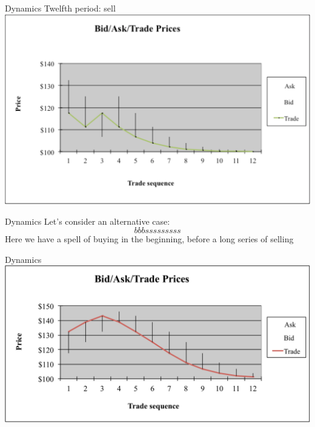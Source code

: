 \documentclass[english,10pt]{beamer}
\begin{document}
\begin{frame}{Dynamics}
	Twelfth period: sell
	\center
	\includegraphics[width=0.9\linewidth]{pics/P12_Image.pdf}
\end{frame}


\begin{frame}{Dynamics}
	Let's consider an alternative case:
	\[
	bbbsssssssss
	\]
	Here we have a spell of buying in the beginning, before a long series of selling
\end{frame}


\begin{frame}{Dynamics}
	\includegraphics[width=1\linewidth]{pics/Bubble_Image.pdf}
	\hyperlink{example}{}
\end{frame}
\end{document}
